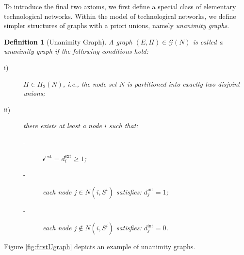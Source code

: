 \documentclass[preprint,11pt,authoryear]{elsarticle}
\theoremstyle{plain}
\newtheorem{definition}[theorem]{Definition}
\begin{document}
To introduce the final two axioms, we first define a special class of elementary technological networks. Within the model of technological networks, we define simpler structures of graphs with a priori unions, namely \emph{unanimity graphs}.

\begin{definition}[Unanimity Graph]\label{unanumity}
A graph $(E, \Pi) \in \mathcal{G}(N)$ is called a \emph{unanimity graph} if the following conditions hold:
\begin{description}
    \item[i)] $\Pi \in \Pi_2(N)$, i.e., the node set $N$ is partitioned into exactly two disjoint unions;
    \item[ii)] there exists at least a node $i$ such that:
    \begin{description}
    \item[-]  $\epsilon^{\text{ext}} = d_i^{\text{ext}} \geq 1$; 
    \item[-] each node $j \in N(i, S^i)$ satisfies: $d_j^{\text{int}} = 1$;
    \item[-] each node $j \notin N(i, S^i)$ satisfies: $d_j^{\text{int}} = 0$.
    \end{description}
\end{description}
\end{definition}
Figure \eqref{fig:firstUgraph} depicts an example of unanimity graphs. 
\end{document}
